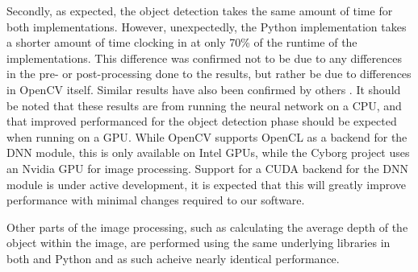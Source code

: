\documentclass[\rootfolder/main.tex]{subfiles}
\begin{document}
Secondly, as expected, the object detection takes the same amount of time for both \CC implementations.
However, unexpectedly, the Python implementation takes a shorter amount of time clocking in at only 70\% of the runtime of the \CC implementations.
This difference was confirmed not to be due to any differences in the pre- or post-processing done to the results, but rather be due to differences in OpenCV itself.
Similar results have also been confirmed by others \cite{Liu}.
It should be noted that these results are from running the neural network on a CPU, and that improved performanced for the object detection phase should be expected when running on a \acrfull{GPU}.
While OpenCV supports OpenCL as a backend for the DNN module, this is only available on Intel GPUs, while the Cyborg project uses an Nvidia GPU for image processing.
Support for a CUDA backend for the DNN module is under active development, it is expected that this will greatly improve performance with minimal changes required to our software.

Other parts of the image processing, such as calculating the average depth of the object within the image, are performed using the same underlying libraries in both \CC and Python and as such acheive nearly identical performance.
\end{document}

